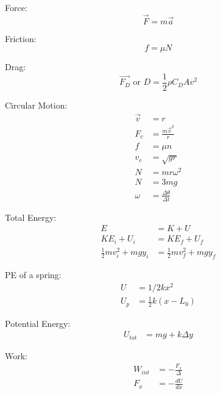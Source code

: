 \documentclass[10pt, letterpaper]{book}
\begin{document}
\begin{multicols*}{2}
        Force:
        \begin{equation}
            \vec{F} = m\vec{a}
        \end{equation}

        Friction:
        \begin{equation}
            f = \mu N
        \end{equation}

        Drag: 
        \begin{equation}
            \vec{F_D}\text{ or }D = \frac{1}{2}\rho C_{D}Av^{2}
        \end{equation}

        Circular Motion:
        \begin{align}
            \vec{v}         & = r                               \\
            F_{c}           & =\frac{m\vec{v}^{2}}{r}           \\
            f               & = \mu n                           \\
            v_{c}           & = \sqrt{gr}                       \\
            N               & = mr\omega^{2}                    \\
            N               & = 3mg                             \\
            \omega          & = \frac{\Delta \theta}{\Delta t}  
        \end{align}

        Total Energy:
        \begin{align}
            E   & = K + U   \\
            KE_{i} + U_{i}  & = KE_{f} + U_{f}  \\
            \frac{1}{2}mv^{2}_{i} + mgy_{i} & = \frac{1}{2}mv^{2}_{f} + mgy_{f}
        \end{align}

        PE of a spring:
        \begin{align}
            U     & = 1/2kx^{2}                 \\
            U_{p} & = \frac{1}{2}k(x-L_{0})
        \end{align}

        Potential Energy:
        \begin{align}
            U_{tot} & = mg + k\Delta y 
        \end{align}

        Work:
        \begin{align}
            W_{int} & = -\frac{F_{x}}{\Delta }   \\
            F_{x}   & = -\frac{dU}{dx}
        \end{align} 


\end{multicols*}
\end{document}
